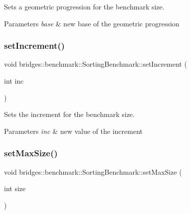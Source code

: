 Sets a geometric progression for the benchmark size. 


\begin{DoxyParams}{Parameters}
{\em base} & new base of the geometric progression \\
\hline
\end{DoxyParams}
\mbox{\label{classbridges_1_1benchmark_1_1_sorting_benchmark_ae168533dc5756f3ede3436bdd7840047}} 
\subsubsection{\texorpdfstring{set\+Increment()}{setIncrement()}}
{\footnotesize\ttfamily void bridges\+::benchmark\+::\+Sorting\+Benchmark\+::set\+Increment (\begin{DoxyParamCaption}\item[{int}]{inc }\end{DoxyParamCaption})\hspace{0.3cm}{\ttfamily [inline]}}



Sets the increment for the benchmark size. 


\begin{DoxyParams}{Parameters}
{\em inc} & new value of the increment \\
\hline
\end{DoxyParams}
\mbox{\label{classbridges_1_1benchmark_1_1_sorting_benchmark_abdca289b823c7f240b648e248c07b059}} 
\subsubsection{\texorpdfstring{set\+Max\+Size()}{setMaxSize()}}
{\footnotesize\ttfamily void bridges\+::benchmark\+::\+Sorting\+Benchmark\+::set\+Max\+Size (\begin{DoxyParamCaption}\item[{int}]{size }\end{DoxyParamCaption})\hspace{0.3cm}{\ttfamily [inline]}}



